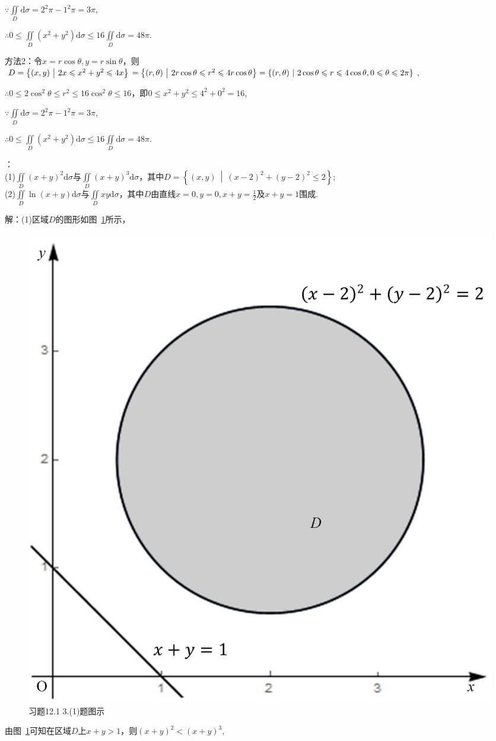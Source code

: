 \documentclass[12pt,UTF8]{ctexart}
\newcommand\Set[2]{\left\{#1\ \middle\vert\ #2 \right\}}
\newcommand{\aIInt}[1]{\iint\limits_{#1}}
\begin{document}
\begin{enumerate}
$\because\aIInt{D}\mathrm d\sigma=2^2\pi-1^2\pi=3\pi$,

$\therefore0\leqslant\aIInt{D}(x^2+y^2)\mathrm d\sigma\leqslant16\aIInt{D}\mathrm d\sigma=48\pi$.

方法2：令$x=r\cos\theta,y=r\sin\theta$，则$D=\Set{(x,y)}{2x\leqslant x^2+y^2\leqslant4x}\\
=\Set{(r,\theta)}{2r\cos\theta\leqslant r^2\leqslant4r\cos\theta}=\Set{(r,\theta)}{2\cos\theta\leqslant r\leqslant4\cos\theta,0\leqslant\theta\leqslant2\pi}$,

$\therefore0\leqslant2\cos^2\theta\leqslant r^2\leqslant16\cos^2\theta\leqslant16$，即$0\leqslant x^2+y^2\leqslant4^2+0^2=16$,

$\because\aIInt{D}\mathrm d\sigma=2^2\pi-1^2\pi=3\pi$,

$\therefore0\leqslant\aIInt{D}(x^2+y^2)\mathrm d\sigma\leqslant16\aIInt{D}\mathrm d\sigma=48\pi$.

：\\
(1)$\aIInt{D}(x+y)^2\mathrm d\sigma$与$\aIInt{D}(x+y)^3\mathrm d\sigma$，其中$D=\Set{(x,y)}{(x-2)^2+(y-2)^2\leqslant2}$;\\
(2)$\aIInt{D}\ln(x+y)\mathrm d\sigma$与$\aIInt{D}xy\mathrm d\sigma$，其中$D$由直线$x=0,y=0,x+y=\frac12$及$x+y=1$围成.

解：(1)区域$D$的图形如图~\ref{3-1}所示，
\begin{figure}[H]
\begin{center}
\includegraphics[height=0.3\textheight]{Figures/Fig3-1.png}
\end{center}
\caption{习题12.1 3.(1)题图示}
\label{3-1}
\end{figure}
由图~\ref{3-1}可知在区域$D$上$x+y>1$，则$(x+y)^2<(x+y)^3$,


\end{enumerate}
\end{document}
